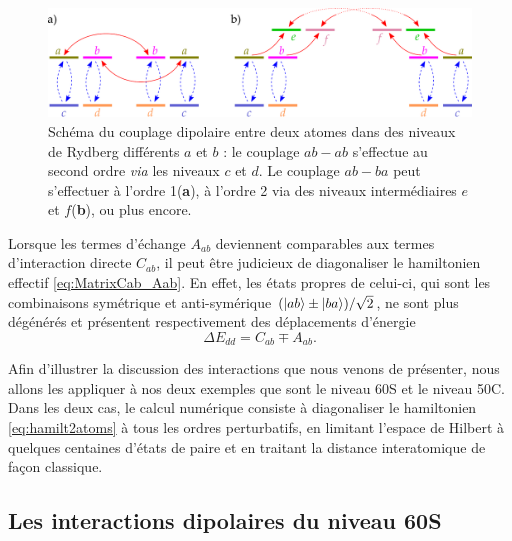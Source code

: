 \begin{figure}[!h]
\centering
\includegraphics[width=0.9\linewidth]{figures/theory/dipole_coupling_abab}
\caption[Couplage dipolaire entre niveaux de Rydberg différents]{Schéma du couplage dipolaire entre deux atomes dans des niveaux de Rydberg différents $a$ et $b$ : le couplage $ab-ab$ s'effectue au second ordre \textit{via} les niveaux $c$ et $d$. Le couplage $ab-ba$ peut s'effectuer à l'ordre 1(\textbf{a}), à l'ordre 2 via des niveaux intermédiaires $e$ et $f$(\textbf{b}), ou plus encore.}
\label{fig:Dip_abab}
\end{figure}


Lorsque les termes d'échange $A_{ab}$ deviennent comparables aux termes d'interaction directe $C_{ab}$, il peut être judicieux de diagonaliser le hamiltonien effectif \eqref{eq:MatrixCab_Aab}.
En effet, les états propres de celui-ci, qui sont les combinaisons symétrique et anti-symérique $(\ket{ab}\pm \ket{ba})/\sqrt{2}$, ne sont plus dégénérés et présentent respectivement des déplacements d'énergie
\begin{equation}
\label{eq:shift_abab}
\Delta E_{dd} = C_{ab} \mp A_{ab}.
\end{equation}

Afin d'illustrer la discussion des interactions que nous venons de présenter, nous allons les appliquer à nos deux exemples que sont le niveau 60S et le niveau 50C.
Dans les deux cas, le calcul numérique consiste à diagonaliser le hamiltonien \eqref{eq:hamilt2atoms} à tous les ordres perturbatifs, en limitant l'espace de Hilbert à quelques centaines d'états de paire et en traitant la distance interatomique de façon classique.

\subsection{Les interactions dipolaires du niveau 60S}

